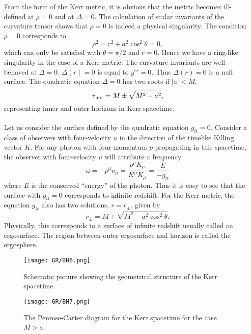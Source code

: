 From the form of the Kerr metric, it is obvious that the metric becomes ill-defined at $\rho = 0$ and at $\Delta = 0$.
The calculation of scalar invariants of the curvature tensor shows that $\rho = 0$ is indeed a physical singularity. The condition $\rho = 0$ corresponds to
\[\rho^2 = r^2 + a^2\cos^2\theta = 0,\]
which can only be satisfied with $\theta = \pi/2$ and $r = 0$. Hence we have a ring-like singularity in the case of a Kerr metric. 
The curvature invariants are well behaved at $\Delta = 0$. 
$\Delta(r) = 0$ is equal to $g^{rr} = 0$. 
Thus $\Delta(r) = 0$ is a null surface.
The quadratic equation $\Delta = 0$ has two roots if $|a| < M$,
\[r_{\rm hor} = M \pm \sqrt{M^2-a^2},\]
representing inner and outer horizons in Kerr spacetime.
\\ \\
Let us consider the surface defined by the quadratic equation $g_{tt} = 0$. 
Consider a class of observers with four-velocity $u$ in the direction of the timelike Killing vector $K$. 
For any photon with four-momentum $p$ propagating in this spacetime, the observer with four-velocity $u$ will attribute a frequency
\[\omega = -p^{\mu}u_{\mu} =  \frac{p^{\mu}K_{\mu}}{K^{\mu}K_{\mu}} = \frac{E}{-g_{tt}}\]
where $E$ is the conserved ``energy'' of the photon. Thus it is easy to see that the surface with $g_{tt} = 0$ corresponds to infinite redshift.
For the Kerr metric, the equation $g_{tt}$ also has two solutions, $r = r_{\pm}$, given by
\[r_{\pm} = M \pm \sqrt{M^2-a^2\cos^2\theta}.\]
Physically, this corresponds to a surface of infinite redshift usually called an ergosurface.
The region between outer ergosurface and horizon is called the ergosphere.

\begin{figure}[!htb]
\centering
\texttt{[image: GR/BH6.png]}
\caption{Schematic picture showing the geometrical structure of the Kerr spacetime.}
\end{figure}

\begin{figure}[!htb]
\centering
\texttt{[image: GR/BH7.png]}
\caption{The Penrose-Carter diagram for the Kerr spacetime for the case $M > a$.}
\end{figure}

